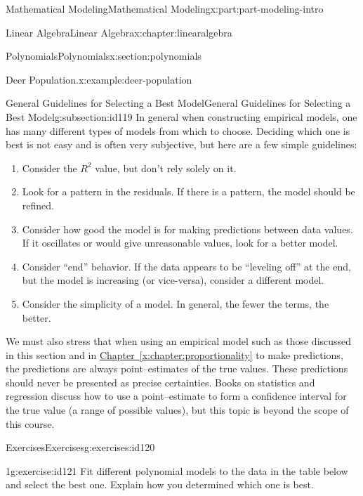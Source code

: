\documentclass[oneside,10pt,]{book}
\newcommand{\xreffont}{\relax}
\numberwithin{equation}{section}
\begin{document}
\begin{partptx}{Mathematical Modeling}{}{Mathematical Modeling}{}{}{x:part:part-modeling-intro}
\begin{chapterptx}{Linear Algebra}{}{Linear Algebra}{}{}{x:chapter:linearalgebra}
\begin{sectionptx}{Polynomials}{}{Polynomials}{}{}{x:section:polynomials}
\begin{example}{Deer Population.}{x:example:deer-population}
\end{example}
%
%
\typeout{************************************************}
\typeout{************************************************}
%
\begin{subsectionptx}{General Guidelines for Selecting a Best Model}{}{General Guidelines for Selecting a Best Model}{}{}{g:subsection:id119}
In general when constructing empirical models, one has many different types of models from which to choose. Deciding which one is best is not easy and is often very subjective, but here are a few simple guidelines:%
%
\begin{enumerate}
\item{}Consider the \(R^2\) value, but don’t rely solely on it.%
\item{}Look for a pattern in the residuals. If there is a pattern, the model should be refined.%
\item{}Consider how good the model is for making predictions between data values. If it oscillates or would give unreasonable values, look for a better model.%
\item{}Consider ``end'' behavior. If the data appears to be ``leveling off'' at the end, but the model is increasing (or vice-versa), consider a different model.%
\item{}Consider the simplicity of a model. In general, the fewer the terms, the better.%
\end{enumerate}
We must also stress that when using an empirical model such as those discussed in this section and in \hyperref[x:chapter:proportionality]{Chapter~{\xreffont\ref{x:chapter:proportionality}}} to make predictions, the predictions are always point–estimates of the true values. These predictions should never be presented as precise certainties. Books on statistics and regression discuss how to use a point–estimate to form a confidence interval for the true value (a range of possible values), but this topic is beyond the scope of this course.%
\end{subsectionptx}
%
%
\typeout{************************************************}
\typeout{************************************************}
%
\begin{exercises-subsection}{Exercises}{}{Exercises}{}{}{g:exercises:id120}
\begin{divisionexercise}{1}{}{}{g:exercise:id121}%
Fit different polynomial models to the data in the table below and select the best one. Explain how you determined which one is best.%

\end{divisionexercise}
\end{exercises-subsection}
\end{sectionptx}
\end{chapterptx}
\end{partptx}
\end{document}
